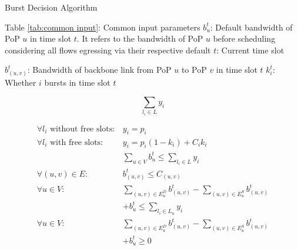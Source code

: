 \begin{algorithm}
	\caption{{\EGRESS} Burst Decision Algorithm}
	\label{alg4}
	\begin{algorithmic}
		\renewcommand{\algorithmicrequire}{ \textbf{Inputs:}}
		\REQUIRE 
		\STATE Table \ref{tab:common input}: Common input parameters
        \STATE $b^t_u$: Default bandwidth of PoP $u$ in time slot $t$. It refers to the bandwidth of PoP $u$ before scheduling considering all flows egressing via their respective default {\egress}
        \STATE $t$: Current time slot
            
		
		\renewcommand{\algorithmicensure}{ \textbf{Outputs:}}
		\ENSURE 
            
            \STATE $b^t_{(u,v)}$: Bandwidth of backbone link from PoP $u$ to PoP $v$ in time slot $t$
            \STATE $k_{i}^t$: Whether {\egress} $i$ bursts in time slot $t$
		
		\renewcommand{\algorithmicensure}{ \textbf{Minimize:}}
		\ENSURE
		$$\sum_{l_i \in L} y_i $$

		\renewcommand{\algorithmicensure}{ \textbf{Subject to:}}
		\ENSURE
            $$\begin{array}{ll}
             \forall l_i \text{ without free slots} : & y_i=p_i\\
             \forall l_i \text{ with free slots} :&y_i=p_i(1-k_i)+C_ik_i\\
            & \sum_{u\in V} b_u^t\le \sum_{l_i \in L} y_i \\
             \forall(u,v) \in E :&b_{(u,v)}^t \le C_{(u,v)}\\
             \forall u \in V : & \sum_{(u,v)\in E_u^D} b_{(u,v)}^t - \sum_{(u,v)\in E_u^S} b_{(u,v)}^t\\& + b_u^t\le \sum_{l_i\in L_u} y_i\\
             \forall u \in V :& \sum_{(u,v)\in E_u^D} b_{(u,v)}^t - \sum_{(u,v)\in E_u^S} b_{(u,v)}^t\\ & + b_u^t \ge 0\\
            
            \end{array}$$
	\end{algorithmic}
\end{algorithm}
